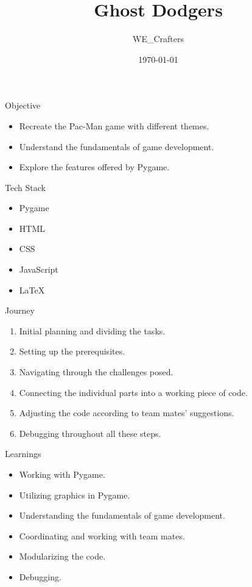 \documentclass{beamer}
\title{Ghost Dodgers}
\author{WE\_Crafters}
\institute{Disha Singla, Krishita Garg, Yasaswini Devi}
\date{\today}
\begin{document}
\frame{\titlepage}

\begin{frame}{Objective}
    \begin{itemize}
        \item Recreate the Pac-Man game with different themes.
        \item Understand the fundamentals of game development.
        \item Explore the features offered by Pygame.
    \end{itemize}
\end{frame}

\begin{frame}{Tech Stack}
    \begin{itemize}
        \item Pygame
        \item HTML
        \item CSS
        \item JavaScript
        \item LaTeX
    \end{itemize}
\end{frame}

\begin{frame}{Journey}
    \begin{enumerate}
        \item Initial planning and dividing the tasks.
        \item Setting up the prerequisites.
        \item Navigating through the challenges posed.
        \item Connecting the individual parts into a working piece of code.
        \item Adjusting the code according to team mates' suggestions.
        \item Debugging throughout all these steps.
    \end{enumerate}
\end{frame}

\begin{frame}{Learnings}
    \begin{itemize}
        \item Working with Pygame.
        \item Utilizing graphics in Pygame.
        \item Understanding the fundamentals of game development.
        \item Coordinating and working with team mates.
        \item Modularizing the code.
        \item Debugging.
    \end{itemize}
\end{frame}
\end{document}
